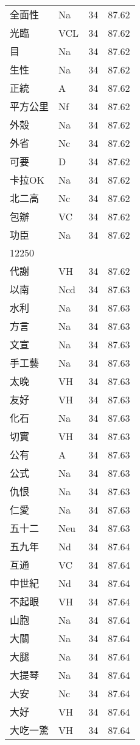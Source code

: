 \documentclass[twocolumn]{book}
\begin{document}
\begin{supertabular}{llrr}
全面性 & Na & 34 &  87.62\\
光臨 & VCL & 34 &  87.62\\
目 & Na & 34 &  87.62\\
生性 & Na & 34 &  87.62\\
正統 & A & 34 &  87.62\\
平方公里 & Nf & 34 &  87.62\\
外殼 & Na & 34 &  87.62\\
外省 & Nc & 34 &  87.62\\
可要 & D & 34 &  87.62\\
卡拉OK & Na & 34 &  87.62\\
北二高 & Nc & 34 &  87.62\\
包辦 & VC & 34 &  87.62\\
功臣 & Na & 34 &  87.62\\
12250\\
代謝 & VH & 34 &  87.62\\
以南 & Ncd & 34 &  87.63\\
水利 & Na & 34 &  87.63\\
方言 & Na & 34 &  87.63\\
文宣 & Na & 34 &  87.63\\
手工藝 & Na & 34 &  87.63\\
太晚 & VH & 34 &  87.63\\
友好 & VH & 34 &  87.63\\
化石 & Na & 34 &  87.63\\
切實 & VH & 34 &  87.63\\
公有 & A & 34 &  87.63\\
公式 & Na & 34 &  87.63\\
仇恨 & Na & 34 &  87.63\\
仁愛 & Na & 34 &  87.63\\
五十二 & Neu & 34 &  87.63\\
五九年 & Nd & 34 &  87.64\\
互通 & VC & 34 &  87.64\\
中世紀 & Nd & 34 &  87.64\\
不起眼 & VH & 34 &  87.64\\
山胞 & Na & 34 &  87.64\\
大關 & Na & 34 &  87.64\\
大腿 & Na & 34 &  87.64\\
大提琴 & Na & 34 &  87.64\\
大安 & Nc & 34 &  87.64\\
大好 & VH & 34 &  87.64\\
大吃一驚 & VH & 34 &  87.64\\

\end{supertabular}
\end{document}
